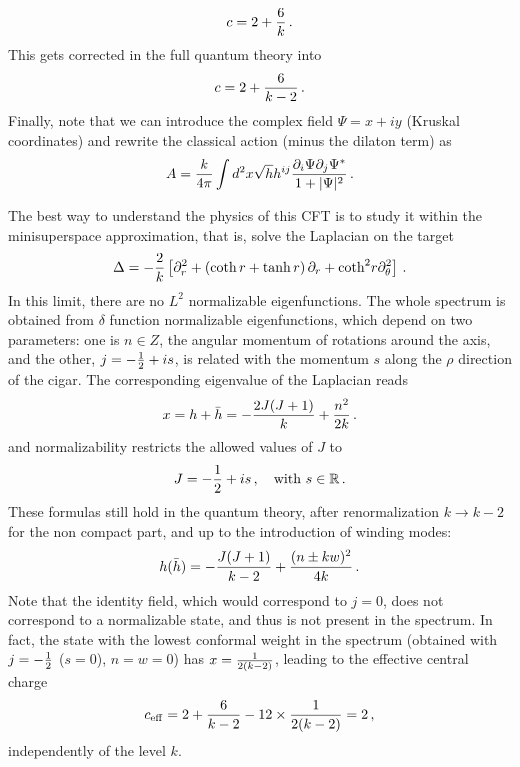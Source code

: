 \documentclass[11pt]{article}
\begin{document}
%
\begin{equation}
 c=2+{6\over k} \,.
\end{equation}
%
This gets corrected in the full quantum theory into 
\begin{equation}
 c=2+{6\over k-2} \,.
\end{equation}
%
Finally, note that we can introduce the complex field $\Psi=x+iy$ (Kruskal coordinates)  and rewrite the classical action (minus the dilaton term) as
%
\begin{equation}
 A={k\over 4\pi}\int d^2x \sqrt{h}h^{ij}{\partial_i \Psi\partial_j \Psi^*\over 1+|\Psi|^2} \,.
\end{equation}
 
The best way to understand the physics of this CFT is to study it within the minisuperspace approximation, that is, solve the Laplacian on the target \cite{RibSch}
%
\begin{equation}
 \Delta=-{2\over k}\left[\partial_r^2+\left(\coth r+ \tanh r \right)\partial_r+\hbox{coth}^2 r\partial_\theta^2\right] \label{LapTar}\,.
\end{equation}
%
In this limit, there are no $L^2$ normalizable eigenfunctions. The whole spectrum is obtained from $\delta$ function normalizable eigenfunctions, which depend on two parameters: one is $n\in Z$, the angular momentum of rotations around the axis, and the other, $j=-{1\over 2}+is$, is related with the momentum $s$ along the $\rho$ direction of the cigar. The corresponding eigenvalue of the Laplacian reads
%
\begin{equation}
 x=h+\bar{h}=-{2J(J+1)\over k}+{n^2\over 2k} \,.
\end{equation}
%
and normalizability restricts the allowed values of $J$ to 
%
\begin{equation}
 J=-{1\over 2}+is \,, \quad \mbox{with } s \in \mathbb{R} \,.
\end{equation}
%
These formulas still hold in the quantum theory, after renormalization $k\to k-2$ for the non compact part, and up to the introduction of winding modes:
%
\begin{equation}
h(\bar{h})=-{J(J+1)\over k-2}+{(n\pm kw)^2\over 4k} \,.
\label{hBHwind}
\end{equation}
%
Note  that the identity field, which would correspond to $j=0$, does not correspond to a normalizable state, and thus is not present in the spectrum. In fact, the state with the lowest conformal weight in the spectrum (obtained with $j=-{1\over 2}$ ($s=0$), $n=w=0$) has $x={1\over 2(k-2)}$, leading to the effective central charge
%
\begin{equation}
c_{\rm eff}=2+{6\over k-2}-12\times {1\over 2(k-2)}=2 \,,
\end{equation}
%
independently of the level $k$. 
\end{document}
